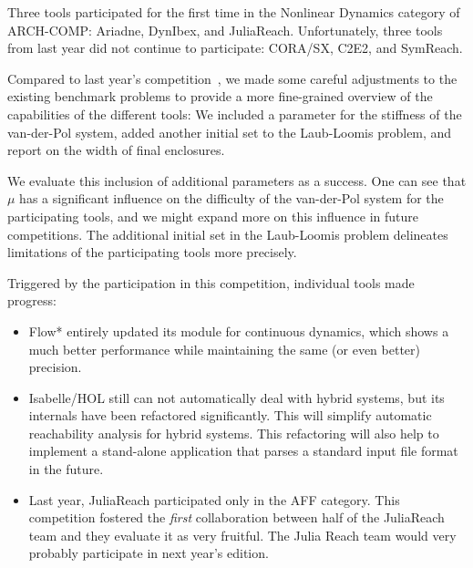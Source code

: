 \documentclass[EPiC]{easychair}
\begin{document}
Three tools participated for the first time in the Nonlinear Dynamics category of ARCH-COMP: Ariadne, DynIbex, and JuliaReach. Unfortunately, three tools from last year did not continue to participate: CORA/SX, C2E2, and SymReach.

Compared to last year's competition~\cite{ARCH_COMP18}, we made some careful adjustments to the existing benchmark problems to provide a more fine-grained overview of the capabilities of the different tools:
We included a parameter for the stiffness of the van-der-Pol system, added another initial set to the Laub-Loomis problem, and report on the width of final enclosures.

We evaluate this inclusion of additional parameters as a success.
One can see that $\mu$ has a significant influence on the difficulty of the van-der-Pol system for the participating tools, and we might expand more on this influence in future competitions. The additional initial set in the Laub-Loomis problem delineates limitations of the participating tools more precisely.

Triggered by the participation in this competition, individual tools made progress:
\begin{itemize}
\item Flow* entirely updated its module for continuous dynamics, which  shows a much better performance while maintaining the same (or even better) precision.
\item Isabelle/HOL still can not automatically deal with hybrid systems, but its internals have been refactored significantly. This will simplify automatic reachability analysis for hybrid systems. This refactoring will also help to implement a stand-alone application that parses a standard input file format in the future.
\item Last year, JuliaReach participated only in the AFF category. This competition fostered the \emph{first} collaboration between half of the JuliaReach team and they evaluate it as very fruitful. The Julia Reach team would very probably participate in next year's edition.

\end{itemize}
\end{document}
